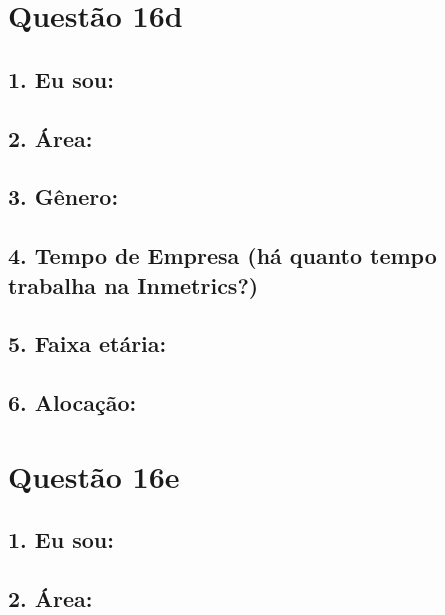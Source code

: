 \documentclass[]{book}
\begin{document}
\hypertarget{questao-16d}{%
\section{Questão 16d}\label{questao-16d}}

\hypertarget{eu-sou-32}{%
\subsection{1. Eu sou:}\label{eu-sou-32}}

\hypertarget{area-32}{%
\subsection{2. Área:}\label{area-32}}

\hypertarget{genero-32}{%
\subsection{3. Gênero:}\label{genero-32}}

\hypertarget{tempo-de-empresa-ha-quanto-tempo-trabalha-na-inmetrics-32}{%
\subsection{4. Tempo de Empresa (há quanto tempo trabalha na Inmetrics?)}\label{tempo-de-empresa-ha-quanto-tempo-trabalha-na-inmetrics-32}}

\hypertarget{faixa-etaria-32}{%
\subsection{5. Faixa etária:}\label{faixa-etaria-32}}

\hypertarget{alocacao-32}{%
\subsection{6. Alocação:}\label{alocacao-32}}

\hypertarget{questao-16e}{%
\section{Questão 16e}\label{questao-16e}}

\hypertarget{eu-sou-33}{%
\subsection{1. Eu sou:}\label{eu-sou-33}}

\hypertarget{area-33}{%
\subsection{2. Área:}\label{area-33}}
\end{document}
